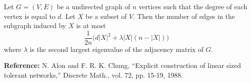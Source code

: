\documentclass[12pt]{article}
\begin{document}
Let $G= (V,E)$ be a undirected graph of $n$ vertices such that the degree of each vertex is equal to $d$. Let $X$ be a subset of $V$. Then the number of edges in the subgraph induced by $X$ is at most
\[
\frac{1}{2n} \Big( d|X|^2 +  \lambda |X|(n- |X|) \Big)
\]
where $\lambda$ is the second largest eigenvalue of the adjacency matrix of $G$.


\bigskip


{\bf Reference:} N. Alon and F. R. K. Chung, ``Explicit construction of linear sized
tolerant networks,'' Discrete Math., vol. 72, pp. 15-19, 1988.

\end{document}
